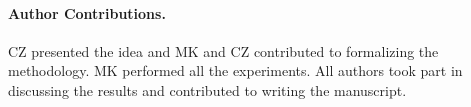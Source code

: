 

\paragraph{Author Contributions.} 
CZ presented the idea and MK and CZ contributed to formalizing the methodology. 
MK performed all the experiments. 
All authors took part in discussing the results and contributed to writing the manuscript. 